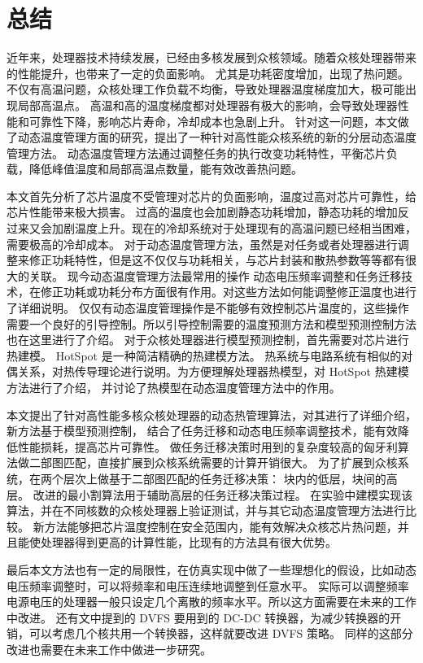 
\chapter{总结}

近年来，处理器技术持续发展，已经由多核发展到众核领域。随着众核处理器带来的性能提升，也带来了一定的负面影响。
尤其是功耗密度增加，出现了热问题。不仅有高温问题，众核处理工作负载不均衡，导致处理器温度梯度加大，极可能出现局部高温点。
高温和高的温度梯度都对处理器有极大的影响，会导致处理器性能和可靠性下降，影响芯片寿命，冷却成本也急剧上升。
针对这一问题，本文做了动态温度管理方面的研究，提出了一种针对高性能众核系统的新的分层动态温度管理方法。
动态温度管理方法通过调整任务的执行改变功耗特性，平衡芯片负载，降低峰值温度和局部高温点数量，能有效改善热问题。

本文首先分析了芯片温度不受管理对芯片的负面影响，温度过高对芯片可靠性，给芯片性能带来极大损害。
过高的温度也会加剧静态功耗增加，静态功耗的增加反过来又会加剧温度上升。现在的冷却系统对于处理现有的高温问题已经相当困难，需要极高的冷却成本。
对于动态温度管理方法，虽然是对任务或者处理器进行调整来修正功耗特性，但是这不仅仅与功耗相关，与芯片封装和散热参数等等都有很大的关联。
现今动态温度管理方法最常用的操作 动态电压频率调整和任务迁移技术，在修正功耗或功耗分布方面很有作用。对这些方法如何能调整修正温度也进行了详细说明。
仅仅有动态温度管理操作是不能够有效控制芯片温度的，这些操作需要一个良好的引导控制。所以引导控制需要的温度预测方法和模型预测控制方法也在这里进行了介绍。
对于众核处理器进行模型预测控制，首先需要对芯片进行热建模。 HotSpot 是一种简洁精确的热建模方法。
热系统与电路系统有相似的对偶关系，对热传导理论进行说明。为方便理解处理器热模型，对 HotSpot 热建模方法进行了介绍，
并讨论了热模型在动态温度管理方法中的作用。

本文提出了针对高性能多核众核处理器的动态热管理算法，对其进行了详细介绍，新方法基于模型预测控制，
结合了任务迁移和动态电压频率调整技术，能有效降低性能损耗，提高芯片可靠性。
做任务迁移决策时用到的复杂度较高的匈牙利算法做二部图匹配，直接扩展到众核系统需要的计算开销很大。
为了扩展到众核系统，在两个层次上做基于二部图匹配的任务迁移决策：
块内的低层，块间的高层。
改进的最小割算法用于辅助高层的任务迁移决策过程。
在实验中建模实现该算法，并在不同核数的众核处理器上验证测试，并与其它动态温度管理方法进行比较。
新方法能够把芯片温度控制在安全范围内，能有效解决众核芯片热问题，并且能使处理器得到更高的计算性能，比现有的方法具有很大优势。

最后本文方法也有一定的局限性，在仿真实现中做了一些理想化的假设，比如动态电压频率调整时，可以将频率和电压连续地调整到任意水平。
实际可以调整频率电源电压的处理器一般只设定几个离散的频率水平。所以这方面需要在未来的工作中改进。
还有文中提到的 DVFS 要用到的 DC-DC 转换器，为减少转换器的开销，可以考虑几个核共用一个转换器，这样就要改进 DVFS 策略。
同样的这部分改进也需要在未来工作中做进一步研究。






























